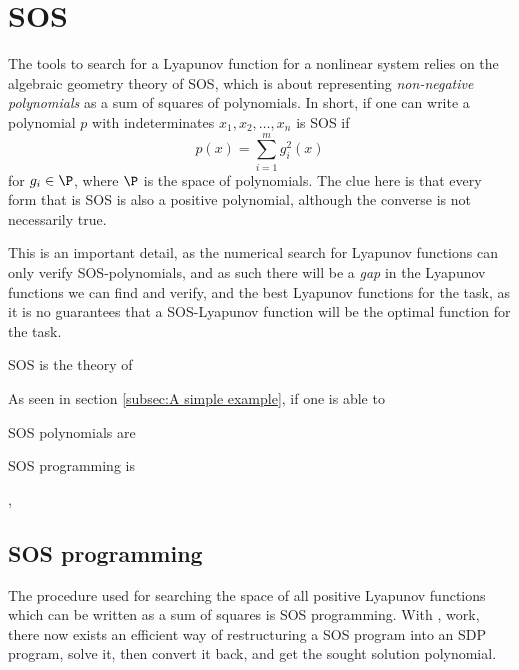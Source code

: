 \section{SOS}

The tools to search for a Lyapunov function for a nonlinear system relies on the
algebraic geometry theory of \ac{SOS}, which is about representing
\textit{non-negative polynomials} as a sum of squares of polynomials. In short,
if one can write a polynomial \(p\) with indeterminates \(x_1,x_2,\ldots,x_n\)
is \ac{SOS} if
\[
  p(x) = \sum_{i=1}^{m}g_i^2(x)
\]
for \(g_i \in \P\), where \(\P\) is the space of polynomials. The clue here is
that every form that is \ac{SOS} is also a positive polynomial, although the
converse is not necessarily true\cite{majumdarFunnelLibrariesRealtime2017}.

This is an important detail, as the numerical search for Lyapunov functions can
only verify \ac{SOS}-polynomials, and as such there will be a \textit{gap} in
the Lyapunov functions we can find and verify, and the best Lyapunov functions
for the task, as it is no guarantees that a \ac{SOS}-Lyapunov function will be
the optimal function for the task.

\ac{SOS} is the theory of

As seen in section \ref{subsec:A simple example}, if one is able to

\acl{SOS} polynomials are

\acl{SOS} programming is

\cite{parilloStructuredSemidefinitePrograms},

\subsection{SOS programming}

The procedure used for searching the space of all positive Lyapunov functions
which can be written as a sum of squares is \ac{SOS} programming. With
\cite[Parillo's]{parilloStructuredSemidefinitePrograms}, work, there now exists
an efficient way of restructuring a \ac{SOS} program into an \ac{SDP} program,
solve it, then convert it back, and get the sought solution polynomial.

